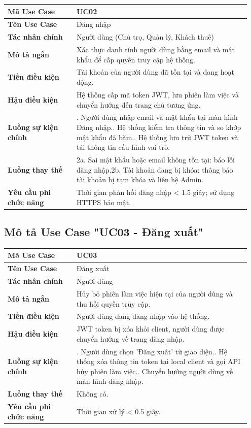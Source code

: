 \documentclass[a4paper,oneside]{report}
\begin{document}
\begin{longtable}[]{@{}>{\RaggedRight\arraybackslash}p{0.27\linewidth}>{\RaggedRight\arraybackslash}p{0.68\linewidth}@{}}
\toprule
\textbf{Mã Use Case} & UC02\tabularnewline
\midrule
\endhead
\textbf{Tên Use Case} & Đăng nhập\tabularnewline
\textbf{Tác nhân chính} & Người dùng (Chủ trọ, Quản lý, Khách
thuê)\tabularnewline
\textbf{Mô tả ngắn} & Xác thực danh tính người dùng bằng email và mật
khẩu để cấp quyền truy cập hệ thống.\tabularnewline
\textbf{Tiền điều kiện} & Tài khoản của người dùng đã tồn tại và đang
hoạt động.\tabularnewline
\textbf{Hậu điều kiện} & Hệ thống cấp mã token JWT, lưu phiên làm việc
và chuyển hướng đến trang chủ tương ứng.\tabularnewline
\textbf{Luồng sự kiện chính} & 1. Người dùng nhập
email và mật khẩu tại màn hình Đăng nhập.\newline 2. Hệ thống kiểm
tra thông tin và so khớp mật khẩu đã băm.\newline 3. Hệ thống lưu
trữ JWT token và tải thông tin cấu hình vai trò.\tabularnewline
\textbf{Luồng thay thế} & 2a. Sai mật khẩu hoặc email
không tồn tại: báo lỗi đăng nhập.\newline 2b. Tài khoản đang bị
khóa: thông báo tài khoản bị tạm khóa và liên hệ Admin.\tabularnewline
\textbf{Yêu cầu phi chức năng} & Thời gian phản hồi đăng nhập
\textless{} 1.5 giây; sử dụng HTTPS bảo mật.\tabularnewline
\bottomrule
\end{longtable}

\subsection{Mô tả Use Case "UC03 - Đăng xuất"}

\begin{longtable}[]{@{}>{\RaggedRight\arraybackslash}p{0.27\linewidth}>{\RaggedRight\arraybackslash}p{0.68\linewidth}@{}}
\toprule
\textbf{Mã Use Case} & UC03\tabularnewline
\midrule
\endhead
\textbf{Tên Use Case} & Đăng xuất\tabularnewline
\textbf{Tác nhân chính} & Người dùng\tabularnewline
\textbf{Mô tả ngắn} & Hủy bỏ phiên làm việc hiện tại của người dùng và
thu hồi quyền truy cập.\tabularnewline
\textbf{Tiền điều kiện} & Người dùng đang đăng nhập vào hệ
thống.\tabularnewline
\textbf{Hậu điều kiện} & JWT token bị xóa khỏi client, người dùng được
chuyển hướng về trang đăng nhập.\tabularnewline
\textbf{Luồng sự kiện chính} & 1. Người dùng chọn
'Đăng xuất' từ giao diện.\newline 2. Hệ thống xóa thông tin token
tại local client và gọi API hủy phiên làm việc.\newline 3. Chuyển
hướng người dùng về màn hình đăng nhập.\tabularnewline
\textbf{Luồng thay thế} & Không có.\tabularnewline
\textbf{Yêu cầu phi chức năng} & Thời gian xử lý \textless{} 0.5
giây.\tabularnewline
\bottomrule
\end{longtable}
\end{document}

